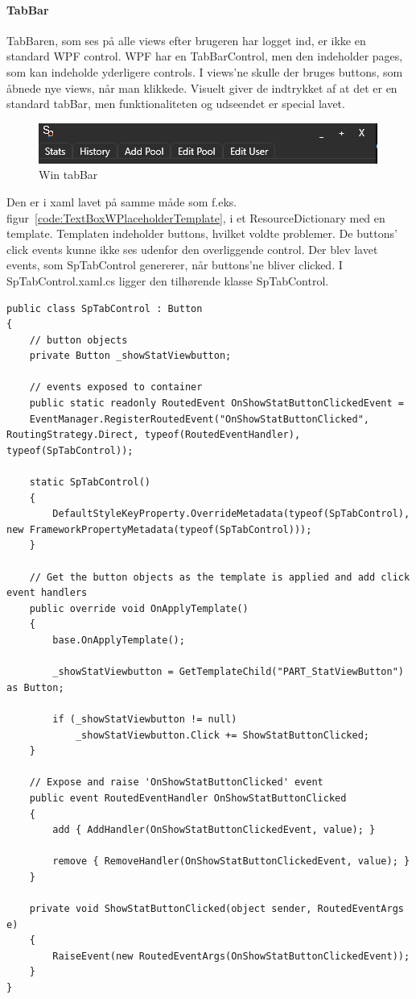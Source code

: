 \paragraph{TabBar}
TabBaren, som ses på alle views efter brugeren har logget ind, er ikke en standard WPF control. WPF har en TabBarControl, men den indeholder pages, som kan indeholde yderligere controls. I views'ne skulle der bruges buttons, som åbnede nye views, når man klikkede. Visuelt giver de indtrykket af at det er en standard tabBar, men funktionaliteten og udseendet er special lavet.
\begin{figure}
\centering
\includegraphics[width=0.7\linewidth]{figs/implementering/tabbar}
\caption{Win tabBar}
\label{fig:tabbar}
\end{figure}
Den er i xaml lavet på samme måde som f.eks. figur~\ref{code:TextBoxWPlaceholderTemplate}, i et ResourceDictionary med en template. 
Templaten indeholder buttons, hvilket voldte problemer. De buttons' click events kunne ikke ses udenfor den overliggende control. Der blev lavet events, som SpTabControl genererer, når buttons'ne bliver clicked.
I SpTabControl.xaml.cs ligger den tilhørende klasse SpTabControl.
\begin{lstlisting}[caption=SpTabControl, label=SpTabControl]
public class SpTabControl : Button
{
	// button objects
	private Button _showStatViewbutton;
	
	// events exposed to container
	public static readonly RoutedEvent OnShowStatButtonClickedEvent =
	EventManager.RegisterRoutedEvent("OnShowStatButtonClicked", RoutingStrategy.Direct, typeof(RoutedEventHandler), typeof(SpTabControl));
	
	static SpTabControl()
	{
		DefaultStyleKeyProperty.OverrideMetadata(typeof(SpTabControl), new FrameworkPropertyMetadata(typeof(SpTabControl)));
	}
	
	// Get the button objects as the template is applied and add click event handlers
	public override void OnApplyTemplate()
	{
		base.OnApplyTemplate();
		
		_showStatViewbutton = GetTemplateChild("PART_StatViewButton") as Button;
		
		if (_showStatViewbutton != null)
			_showStatViewbutton.Click += ShowStatButtonClicked;
	}
	
	// Expose and raise 'OnShowStatButtonClicked' event
	public event RoutedEventHandler OnShowStatButtonClicked
	{
		add { AddHandler(OnShowStatButtonClickedEvent, value); }
	
		remove { RemoveHandler(OnShowStatButtonClickedEvent, value); }
	}
	
	private void ShowStatButtonClicked(object sender, RoutedEventArgs e)
	{
		RaiseEvent(new RoutedEventArgs(OnShowStatButtonClickedEvent));
	}
}
\end{lstlisting}

